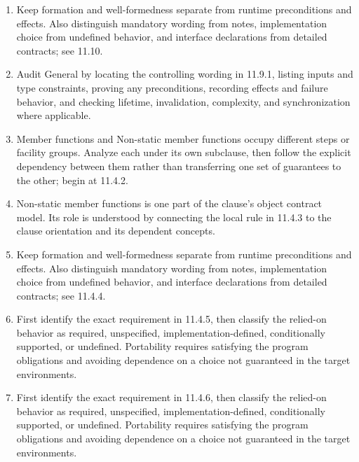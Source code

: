 \documentclass[11pt,letterpaper]{article}
\begin{document}
\begin{enumerate}
\item Keep formation and well-formedness separate from runtime preconditions and effects. Also distinguish mandatory wording from notes, implementation choice from undefined behavior, and interface declarations from detailed contracts; see 11.10.
\item Audit General by locating the controlling wording in 11.9.1, listing inputs and type constraints, proving any preconditions, recording effects and failure behavior, and checking lifetime, invalidation, complexity, and synchronization where applicable.
\item Member functions and Non-static member functions occupy different steps or facility groups. Analyze each under its own subclause, then follow the explicit dependency between them rather than transferring one set of guarantees to the other; begin at 11.4.2.
\item Non-static member functions is one part of the clause's object contract model. Its role is understood by connecting the local rule in 11.4.3 to the clause orientation and its dependent concepts.
\item Keep formation and well-formedness separate from runtime preconditions and effects. Also distinguish mandatory wording from notes, implementation choice from undefined behavior, and interface declarations from detailed contracts; see 11.4.4.
\item First identify the exact requirement in 11.4.5, then classify the relied-on behavior as required, unspecified, implementation-defined, conditionally supported, or undefined. Portability requires satisfying the program obligations and avoiding dependence on a choice not guaranteed in the target environments.
\item First identify the exact requirement in 11.4.6, then classify the relied-on behavior as required, unspecified, implementation-defined, conditionally supported, or undefined. Portability requires satisfying the program obligations and avoiding dependence on a choice not guaranteed in the target environments.
\end{enumerate}
\end{document}
